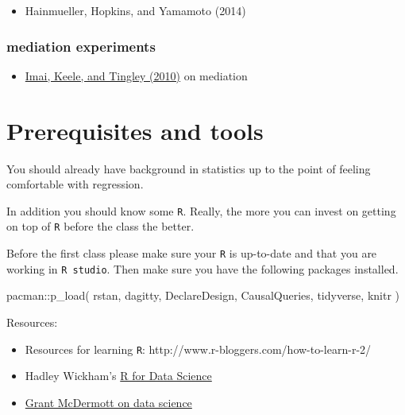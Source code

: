 \documentclass[
  10pt,
  a4paper,10pt]{extarticle}
\newenvironment{Shaded}{\begin{snugshade}}{\end{snugshade}}
\newcommand{\FunctionTok}[1]{\textcolor[rgb]{0.28,0.35,0.67}{#1}}
\newcommand{\NormalTok}[1]{\textcolor[rgb]{0.00,0.23,0.31}{#1}}
\newcommand{\SpecialCharTok}[1]{\textcolor[rgb]{0.37,0.37,0.37}{#1}}
\providecommand{\tightlist}{%
  \setlength{\itemsep}{0pt}\setlength{\parskip}{0pt}}
\begin{document}
\begin{itemize}
\tightlist
\item
  Hainmueller, Hopkins, and Yamamoto (2014)
\end{itemize}

\subsubsection{mediation experiments}\label{mediation-experiments}

\begin{itemize}
\tightlist
\item
  \href{https://imai.fas.harvard.edu/research/files/BaronKenny.pdf}{Imai,
  Keele, and Tingley (2010)} on mediation
\end{itemize}

\newpage

\section{Prerequisites and tools}\label{prerequisites-and-tools}

You should already have background in statistics up to the point of
feeling comfortable with regression.

In addition you should know some \texttt{R}. Really, the more you can
invest on getting on top of \texttt{R} before the class the better.

Before the first class please make sure your \texttt{R} is up-to-date
and that you are working in \texttt{R\ studio}. Then make sure you have
the following packages installed.

\begin{Shaded}
\begin{Highlighting}[]
\NormalTok{pacman}\SpecialCharTok{::}\FunctionTok{p\_load}\NormalTok{(}
\NormalTok{  rstan, }
\NormalTok{  dagitty, }
\NormalTok{  DeclareDesign, }
\NormalTok{  CausalQueries,}
\NormalTok{  tidyverse,}
\NormalTok{  knitr}
\NormalTok{  )}
\end{Highlighting}
\end{Shaded}

Resources:

\begin{itemize}
\tightlist
\item
  Resources for learning \texttt{R}:
  http://www.r-bloggers.com/how-to-learn-r-2/
\item
  Hadley Wickham's \href{https://r4ds.hadley.nz/}{R for Data Science}
\item
  \href{https://grantmcdermott.com/ds4e}{Grant McDermott on data
  science}
\end{itemize}
\end{document}
